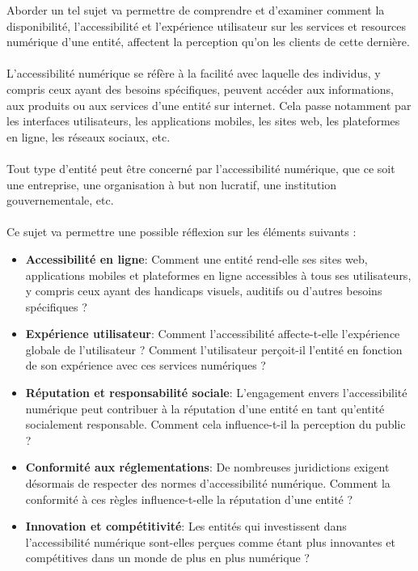\documentclass[12pt, a4paper]{report}
\begin{document}
\noindent
Aborder un tel sujet va permettre de comprendre et d'examiner comment la 
disponibilité, l'accessibilité et l'expérience utilisateur sur les services et 
resources numérique d'une entité, affectent la perception qu'on les clients de 
cette dernière.
\\\\
L'accessibilité numérique se réfère à la facilité avec laquelle des individus,
y compris ceux ayant des besoins spécifiques, peuvent accéder aux informations,
aux produits ou aux services d'une entité sur internet. Cela passe notamment par
les interfaces utilisateurs, les applications mobiles, les sites web, les 
plateformes en ligne, les réseaux sociaux, etc.
\\\\
Tout type d'entité peut être concerné par l'accessibilité numérique, que ce soit 
une entreprise, une organisation à but non lucratif, une institution 
gouvernementale, etc.
\\\\
\noindent
Ce sujet va permettre une possible réflexion sur les éléments suivants :
\begin{itemize}
	\item \textbf{Accessibilité en ligne}: Comment une entité rend-elle ses
	sites web, applications mobiles et plateformes en ligne accessibles à tous ses 
	utilisateurs, y compris ceux ayant des handicaps visuels, auditifs ou d'autres
	besoins spécifiques ?
	\item \textbf{Expérience utilisateur}: Comment l'accessibilité
	affecte-t-elle l'expérience globale de l'utilisateur ? Comment l'utilisateur
	perçoit-il l'entité en fonction de son expérience avec ces services numériques 
	?
	\item \textbf{Réputation et responsabilité sociale}: L'engagement envers
	l'accessibilité numérique peut contribuer à la réputation d'une entité en 
	tant qu'entité socialement responsable. Comment cela influence-t-il la 
	perception du public ?
	\item \textbf{Conformité aux réglementations}: De nombreuses juridictions 
	exigent désormais de respecter des normes d'accessibilité numérique. Comment 
	la conformité à ces règles influence-t-elle la réputation d'une entité ?
	\item \textbf{Innovation et compétitivité}: Les entités qui investissent dans
	l'accessibilité numérique sont-elles perçues comme étant plus innovantes et
	compétitives dans un monde de plus en plus numérique ?
\end{itemize}
\end{document}
